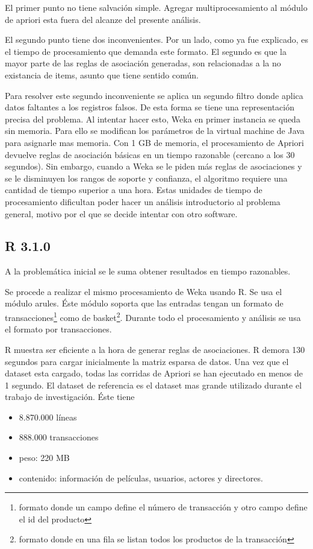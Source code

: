 \documentclass[journal]{IEEEtran}
\begin{document}
El primer punto no tiene salvación simple. Agregar multiprocesamiento al módulo de apriori esta
fuera del alcanze del presente análisis.

El segundo punto tiene dos inconvenientes. Por un lado, como ya fue explicado, es el tiempo de 
procesamiento que demanda este formato. El segundo es que la mayor parte de las reglas de asociación
generadas, son relacionadas a la no existancia de items, asunto que tiene sentido común.

Para resolver este segundo inconveniente se aplica un segundo filtro donde aplica datos faltantes 
a los registros falsos. De esta forma se tiene una representación precisa del problema. Al intentar 
hacer esto, Weka en primer instancia se queda sin memoria. Para ello se modifican los parámetros de
la virtual machine de Java para asignarle mas memoria. Con 1 GB de memoria, el procesamiento de
Apriori devuelve reglas de asociación básicas en un tiempo razonable (cercano a los 30 segundos). 
Sin embargo, cuando a Weka se le piden más reglas de asociaciones y se le disminuyen los rangos de 
soporte y confianza, el algoritmo requiere una cantidad de tiempo superior a una hora. Estas unidades
de tiempo de procesamiento dificultan poder hacer un análisis introductorio al problema general,
motivo por el que se decide intentar con otro software.


\subsection{R 3.1.0}
A la problemática inicial se le suma obtener resultados en tiempo razonables. 

Se procede a realizar el mismo procesamiento de Weka usando R. Se usa el módulo arules. Éste 
módulo soporta que las entradas tengan un formato de transacciones\footnote{formato donde un 
campo define el número de transacción y otro campo define el id del producto}
como de basket\footnote{formato donde en una fila se listan todos los productos de la transacción}.
Durante todo el procesamiento y análisis se usa el formato por transacciones.

R muestra ser eficiente a la hora de generar reglas de asociaciones. R demora 130 segundos para
cargar inicialmente la matriz esparsa de datos. Una vez que el dataset esta cargado, todas las
corridas de Apriori se han ejecutado en menos de 1 segundo. El dataset de referencia es el
dataset mas grande utilizado durante el trabajo de investigación. Éste tiene
\begin{itemize}
	\item 8.870.000 líneas
	\item 888.000 transacciones
	\item peso: 220 MB
	\item contenido: información de películas, usuarios, actores y directores.
\end{itemize}
\end{document}
